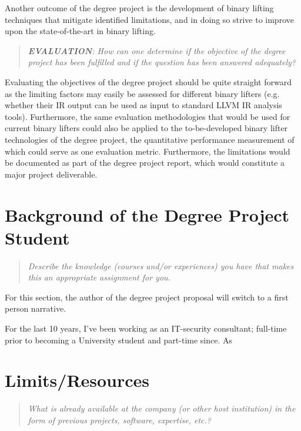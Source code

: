 \documentclass[12pt, a4paper]{article}
\begin{document}
Another outcome of the degree project is the development of binary lifting techniques that mitigate identified limitations, and in doing so strive to improve upon the state-of-the-art in binary lifting.

\begin{quote}
	\textit{\textbf{EVALUATION}: How can one determine if the objective of the degree project has been fulfilled and if the question has been answered adequately?}
\end{quote}

Evaluating the objectives of the degree project should be quite straight forward as the limiting factors may easily be assessed for different binary lifters (e.g. whether their IR output can be used as input to standard LLVM IR analysis tools). Furthermore, the same evaluation methodologies that would be used for current binary lifters could also be applied to the to-be-developed binary lifter technologies of the degree project, the quantitative performance measurement of which could serve as one evaluation metric. Furthermore, the limitations would be documented as part of the degree project report, which would constitute a major project deliverable.

\section{Background of the Degree Project Student}

\begin{quote}
	\textit{\textit{Describe the knowledge (courses and/or experiences) you have that makes this an appropriate assignment for you.}}
\end{quote}

For this section, the author of the degree project proposal will switch to a first person narrative.

For the last 10 years, I've been working as an IT-security consultant; full-time prior to becoming a University student and part-time since. As 

\section{Limits/Resources}

\begin{quote}
	\textit{\textit{What is already available at the company (or other host institution) in the form of previous projects, software, expertise, etc.?}}
\end{quote}
\end{document}

